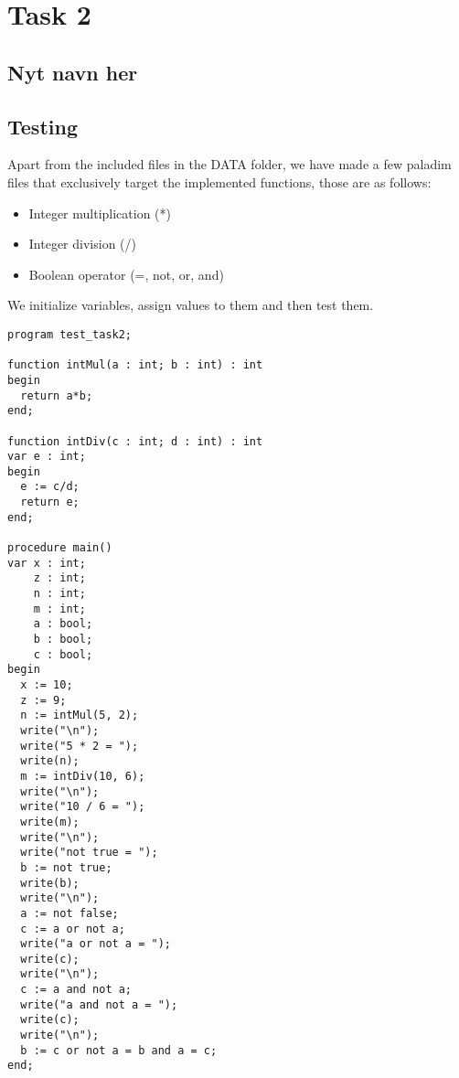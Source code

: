 \section{Task 2}

\subsection{Nyt navn her}

\subsection{Testing}
Apart from the included files in the DATA folder, we have made a few paladim
files that exclusively target the implemented functions, those are as follows:
\\
\begin{itemize}
  \item Integer multiplication (*)
  \item Integer division (/)
  \item Boolean operator (=, not, or, and)
\end{itemize}

We initialize variables, assign values to them and then test them.
\begin{lstlisting}[style=MLStyle]
program test_task2;

function intMul(a : int; b : int) : int
begin
  return a*b;
end;

function intDiv(c : int; d : int) : int
var e : int;
begin
  e := c/d;
  return e;
end;

procedure main()
var x : int;
    z : int;
    n : int;
    m : int;
    a : bool;
    b : bool;
    c : bool;
begin
  x := 10;
  z := 9;
  n := intMul(5, 2);
  write("\n");
  write("5 * 2 = ");
  write(n);
  m := intDiv(10, 6);
  write("\n");
  write("10 / 6 = ");
  write(m);
  write("\n");
  write("not true = ");
  b := not true;
  write(b);
  write("\n");
  a := not false;
  c := a or not a;
  write("a or not a = ");
  write(c);
  write("\n");
  c := a and not a;
  write("a and not a = ");
  write(c);
  write("\n");
  b := c or not a = b and a = c;
end;
\end{lstlisting}
